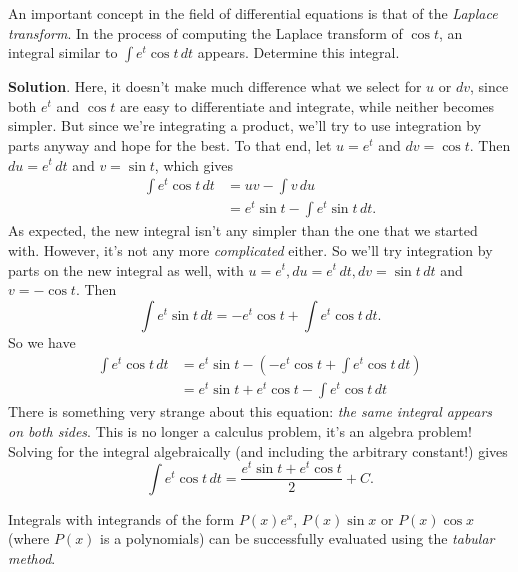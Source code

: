 \documentclass[10pt,]{book}
\theoremstyle{ptxplainnotitle}
\theoremstyle{ptxplaintitle}
\theoremstyle{ptxplainnotitle}
\theoremstyle{ptxplaintitle}
\theoremstyle{ptxplainnotitle}
\theoremstyle{ptxplaintitle}
\theoremstyle{ptxdefinitionnotitle}
\theoremstyle{ptxdefinitiontitle}
\theoremstyle{ptxdefinitionnotitle}
\theoremstyle{ptxdefinitiontitle}
\theoremstyle{ptxdefinitionnotitle}
\theoremstyle{ptxdefinitiontitle}
\theoremstyle{ptxdefinitionnotitle}
\theoremstyle{ptxdefinitiontitle}
\theoremstyle{ptxdefinitionnotitle}
\theoremstyle{ptxdefinitiontitle}
\numberwithin{equation}{section}
\begin{document}
\begin{example}\label{example-an-integral-from-differential-equations}
\hypertarget{p-509}{}%
An important concept in the field of differential equations is that of the \emph{Laplace transform}. In the process of computing the Laplace transform of \(\cos t\), an integral similar to \(\int e^{t}\cos t\,dt\) appears. Determine this integral.%
\par\smallskip%
\noindent\textbf{Solution}.\hypertarget{solution-112}{}\quad%
\hypertarget{p-510}{}%
Here, it doesn't make much difference what we select for \(u\) or \(dv\), since both \(e^{t}\) and \(\cos t\) are easy to differentiate and integrate, while neither becomes simpler. But since we're integrating a product, we'll try to use integration by parts anyway and hope for the best. To that end, let \(u = e^{t}\) and \(dv = \cos t\). Then \(du = e^{t}\,dt\) and \(v = \sin t\), which gives%
%
\begin{align*}
\int e^{t}\cos t\,dt & = uv - \int v\,du \\
& = e^{t}\sin t - \int e^{t}\sin t\,dt. 
\end{align*}
\hypertarget{p-511}{}%
As expected, the new integral isn't any simpler than the one that we started with. However, it's not any more \emph{complicated} either. So we'll try integration by parts on the new integral as well, with \(u = e^{t}, du = e^{t}\,dt, dv = \sin t\,dt\) and \(v = -\cos t\). Then%
%
\begin{equation*}
\int e^{t}\sin t\,dt = -e^{t}\cos t + \int e^{t}\cos t\,dt.
\end{equation*}
\hypertarget{p-512}{}%
So we have%
%
\begin{align*}
\int e^{t}\cos t\,dt & = e^{t}\sin t - (-e^{t}\cos t + \int e^{t}\cos t\,dt) \\
& = e^{t}\sin t + e^{t}\cos t - \int e^{t}\cos t\,dt 
\end{align*}
\hypertarget{p-513}{}%
There is something very strange about this equation: \emph{the same integral appears on both sides}. This is no longer a calculus problem, it's an algebra problem! Solving for the integral algebraically (and including the arbitrary constant!) gives%
\begin{equation*}
\int e^{t}\cos t\,dt = \frac{e^{t}\sin t + e^{t}\cos t}{2} + C.
\end{equation*}
%
\end{example}
\hypertarget{p-514}{}%
Integrals with integrands of the form \(P(x)e^{x}\), \(P(x)\sin x\) or \(P(x)\cos x\) (where \(P(x)\) is a polynomials) can be successfully evaluated using the \emph{tabular method}.%
\end{document}
